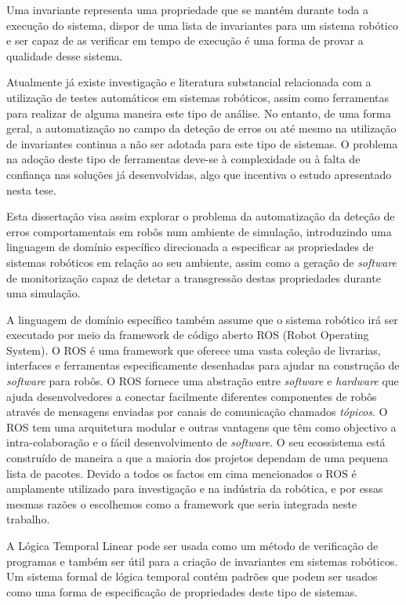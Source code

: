Uma invariante representa uma propriedade que se mantém durante toda a execução do sistema, dispor de uma lista de invariantes para um sistema robótico e ser capaz de as verificar em tempo de execução é uma forma de provar a qualidade desse sistema.

Atualmente já existe investigação e literatura substancial relacionada com a utilização de testes automáticos em sistemas robóticos, assim como ferramentas para realizar de alguma maneira este tipo de análise. No entanto, de uma forma geral, a automatização no campo da deteção de erros ou até mesmo na utilização de invariantes continua a não ser adotada para este tipo de sistemas. O problema na adoção deste tipo de ferramentas deve-se à complexidade ou à falta de confiança nas soluções já desenvolvidas, algo que incentiva o estudo apresentado nesta tese.

Esta dissertação visa assim explorar o problema da automatização da deteção de erros comportamentais em robôs num ambiente de simulação, introduzindo uma linguagem de domínio específico direcionada a especificar as propriedades de sistemas robóticos em relação ao seu ambiente, assim como a geração de \textit{software} de monitorização capaz de detetar a transgressão destas propriedades durante uma simulação.

A linguagem de domínio específico também assume que o sistema robótico irá ser executado por meio da framework de código aberto ROS (Robot Operating System). O ROS é uma framework que oferece uma vasta coleção de livrarias, interfaces e ferramentas especificamente desenhadas para ajudar na construção de \textit{software} para robôs. O ROS fornece uma abstração entre \textit{software} e \textit{hardware} que ajuda desenvolvedores a conectar facilmente diferentes componentes de robôs através de mensagens enviadas por canais de comunicação chamados \textit{tópicos}. O ROS tem uma arquitetura modular e outras vantagens que têm como objectivo a intra-colaboração e o fácil desenvolvimento de \textit{software}. O seu ecossistema está construído de maneira a que a maioria dos projetos dependam de uma pequena lista de pacotes. Devido a todos os factos em cima mencionados o ROS é amplamente utilizado para investigação e na indústria da robótica, e por essas mesmas razões o escolhemos como a framework que seria integrada neste trabalho.

A Lógica Temporal Linear pode ser usada como um método de verificação de programas e também ser útil para a criação de invariantes em sistemas robóticos. Um sistema formal de lógica temporal contém padrões que podem ser usados como uma forma de especificação de propriedades deste tipo de sistemas.

